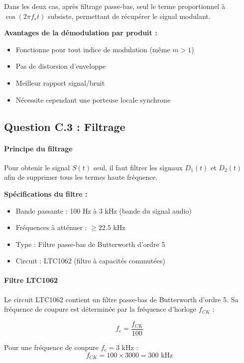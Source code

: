 \documentclass[11pt,a4paper]{article}
\begin{document}
Dans les deux cas, après filtrage passe-bas, seul le terme proportionnel à $\cos(2\pi f_s t)$ subsiste, permettant de récupérer le signal modulant.

\textbf{Avantages de la démodulation par produit :}
\begin{itemize}
    \item Fonctionne pour tout indice de modulation (même $m > 1$)
    \item Pas de distorsion d'enveloppe
    \item Meilleur rapport signal/bruit
    \item Nécessite cependant une porteuse locale synchrone
\end{itemize}

\subsection{Question C.3 : Filtrage}

\paragraph{Principe du filtrage}

Pour obtenir le signal $S(t)$ seul, il faut filtrer les signaux $D_1(t)$ et $D_2(t)$ afin de supprimer tous les termes haute fréquence.

\textbf{Spécifications du filtre :}
\begin{itemize}
    \item Bande passante : 100 Hz à 3 kHz (bande du signal audio)
    \item Fréquences à atténuer : $\geq 22.5$ kHz
    \item Type : Filtre passe-bas de Butterworth d'ordre 5
    \item Circuit : LTC1062 (filtre à capacités commutées)
\end{itemize}

\paragraph{Filtre LTC1062}

Le circuit LTC1062 contient un filtre passe-bas de Butterworth d'ordre 5. Sa fréquence de coupure est déterminée par la fréquence d'horloge $f_{CK}$ :

\begin{equation}
f_c = \frac{f_{CK}}{100}
\end{equation}

Pour une fréquence de coupure $f_c = 3$ kHz :
\begin{equation}
\boxed{f_{CK} = 100 \times 3000 = 300 \text{ kHz}}
\end{equation}
\end{document}
